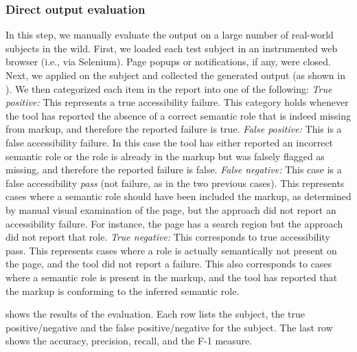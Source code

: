 \subsubsection{Direct output evaluation}
In this step, we manually evaluate the output on a large number 
of real-world subjects in the wild.
First, we loaded each test subject in an instrumented web browser (i.e., via Selenium). 
Page popups or notifications, if any, were closed. 
Next, we applied \toolname on the subject and collected the generated 
output (as shown in ).  
We then categorized each item in the report into one of the following:
\textit{True positive:} 
This represents a true accessibility failure. 
This category holds whenever the tool has reported the absence of 
a correct semantic role that is indeed missing from markup, 
and therefore the reported failure is true.   
\textit{False positive:}
This is a false accessibility failure.
In this case the tool has either reported an incorrect semantic 
role or the role is already in the markup 
but was falsely flagged as missing, and therefore 
the reported failure is false.
\textit{False negative:}
This case is a false accessibility \emph{pass} 
(not failure, as in the two previous cases).
This represents cases where a semantic role should have been included the markup, as determined by manual visual examination of the page, but the approach did not report an accessibility failure. For instance, the page has a search region but the approach did not 
report that role. 
\textit{True negative:}
This corresponds to true accessibility pass.  
This represents cases where a role is actually semantically not present 
on the page, and the tool did not report a failure.
This also corresponds to cases where a semantic role is present in the markup, 
and the tool has reported that the markup is conforming to the inferred semantic role.  



\label{subsec:run-results}
 shows the results of the evaluation. 
Each row lists the subject, the true positive/negative and 
the false positive/negative for the subject. 
The last row shows the accuracy, precision, 
recall, and the F-1 measure. 

